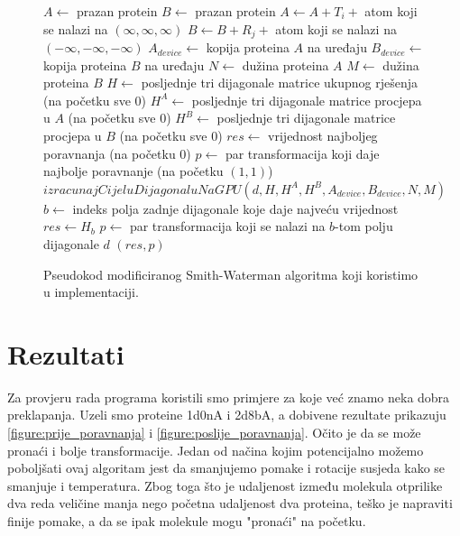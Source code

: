 \documentclass[times, utf8, zavrsni]{fer}
\begin{document}
\begin{figure}
\centering
\begin{algorithmic}
\State $A \gets$ prazan protein
\State $B \gets$ prazan protein
	\State $A \gets A + T_i +$ atom koji se nalazi na $(\infty, \infty, \infty)$
\EndFor
{}
	\State $B \gets B + R_j +$ atom koji se nalazi na $(-\infty, -\infty, -\infty)$
\EndFor
\State $A_{device} \gets$ kopija proteina $A$ na uređaju
\State $B_{device} \gets$ kopija proteina $B$ na uređaju
\State $N \gets$ dužina proteina $A$
\State $M \gets$ dužina proteina $B$
\State $H \gets$ posljednje tri dijagonale matrice ukupnog rješenja (na početku sve $0$)
\State $H^A \gets$ posljednje tri dijagonale matrice procjepa u $A$ (na početku sve $0$)
\State $H^B \gets$ posljednje tri dijagonale matrice procjepa u $B$ (na početku sve $0$)
\State $res \gets$ vrijednost najboljeg poravnanja (na početku $0$)
\State $p \gets $ par transformacija koji daje najbolje poravnanje (na početku $(1,1)$)
	\State $izracunajCijeluDijagonaluNaGPU(d, H, H^A, H^B, A_{device}, B_{device}, N, M)$
	\State $b \gets$ indeks polja zadnje dijagonale koje daje najveću vrijednost
		\State $res \gets H_b$
		\State $p \gets$ par transformacija koji se nalazi na $b$-tom polju dijagonale $d$
	\EndIf
\EndFor
\State \Return $(res, p)$
\end{algorithmic}
\caption[Pseudokod modificiranog Smith-Waterman algoritma]{Pseudokod
modificiranog Smith-Waterman algoritma koji koristimo u implementaciji.}
\label{figure:pseudocode}
\end{figure}




\chapter{Rezultati}
\label{chapter:Rezultati}

Za provjeru rada programa koristili smo primjere za koje već znamo
neka dobra preklapanja. Uzeli smo proteine 1d0nA i 2d8bA, a dobivene
rezultate prikazuju \autoref{figure:prije_poravnanja} i
\autoref{figure:poslije_poravnanja}. Očito je da se može pronaći i
bolje transformacije. Jedan od načina kojim potencijalno možemo
poboljšati ovaj algoritam jest da smanjujemo pomake i rotacije susjeda
kako se smanjuje i temperatura.
Zbog toga što je udaljenost između molekula otprilike dva reda
veličine manja nego početna udaljenost dva proteina, teško
je napraviti finije pomake, a da se ipak molekule mogu
"pronaći" na početku. 
\end{document}
